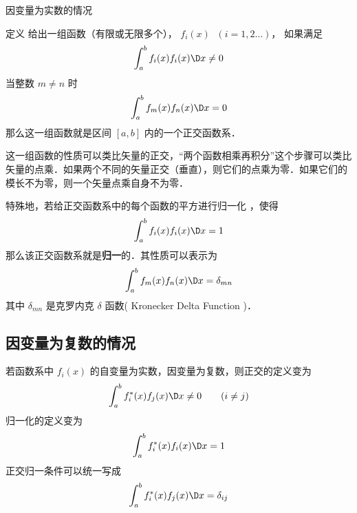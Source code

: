 
因变量为实数的情况

定义
给出一组函数（有限或无限多个）， ${f_i}(x)\;$ $( {i = 1,2\dots} )$，  如果满足
\begin{equation}
\int_a^b {{f_i}(x)} {f_i}(x)\D x \ne 0
\end{equation} 
当整数 $m \ne n$ 时
\begin{equation}
\int_a^b {{f_m}(x)} {f_n}(x)\D x = 0
\end{equation} 
那么这一组函数就是区间 $[a,b]$ 内的一个正交函数系．

这一组函数的性质可以类比矢量的正交，“两个函数相乘再积分”这个步骤可以类比矢量的点乘．如果两个不同的矢量正交（垂直），则它们的点乘为零．如果它们的模长不为零，则一个矢量点乘自身不为零．

特殊地，若给正交函数系中的每个函数的平方进行归一化%
，使得
\begin{equation}
\int_a^b {{f_i}(x)} {f_i}(x)\D x = 1
\end{equation} 
那么该正交函数系就是\textbf{归一}的．其性质可以表示为
 \begin{equation}
\int_a^b {{f_m}(x)} {f_n}(x)\D x = {\delta _{mn}}
\end{equation} 
其中 ${\delta _{mn}}$ 是克罗内克 $\delta$ 函数( Kronecker Delta Function )．


\subsection{因变量为复数的情况}

若函数系中 ${f_i}(x)$ 的自变量为实数，因变量为复数，则正交的定义变为
 \begin{equation}
\int_a^b {f_i^*(x)} {f_j}(x)\D x \ne 0 \qquad ( {i \ne j} )
\end{equation}    
归一化的定义变为
 \begin{equation}
\int_a^b {f_i^*(x)} {f_i}(x)\D x = 1
\end{equation} 
正交归一条件可以统一写成
 \begin{equation}
\int_a^b {f_i^*(x)} {f_j}(x)\D x = {\delta _{ij}}
\end{equation}